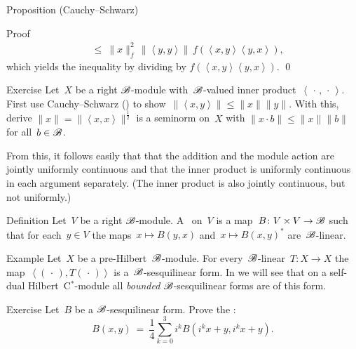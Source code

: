 \begin{parsec}
\begin{point}[module-CS]{Proposition (Cauchy--Schwarz)}
\begin{point}{Proof}
\begin{align*}
    & \ \leq\  \|x\|_f^2 \,
    \|\left<y,y\right>\| \,
    f(\left<x,y\right>\left<y,x\right>),
\end{align*}
    which yields the inequality by dividing by
$f(\left<x,y\right>\left<y,x\right>)$. \qed
\end{point}
\end{point}
\begin{point}{Exercise}
Let~$X$ be a right $\mathscr{B}$-module
    with~$\mathscr{B}$-valued inner product~$\left<\,\cdot\,,\,\cdot\,\right>$.
First use Cauchy--Schwarz ()
    to show~$\|\left<x,y\right>\| \leq \|x\|\|y\|$.
With this, derive $\|x\| =\|\left<x,x\right>\|^{\frac{1}{2}}$ is a seminorm on~$X$ with
    $\|x \cdot b \| \leq \|x\|\|b\|$
    for all~$b \in \mathscr{B}$.
\begin{point}%
From this, it follows easily that
that the addition and the module action
are jointly uniformly continuous
    and that the inner product is uniformly continuous in each argument
    separately.
(The inner product is also jointly continuous,
    but not uniformly.)
\end{point}
\end{point}
\begin{point}{Definition}%
Let~$V$ be a right $\mathscr{B}$-module.
A~ on~$V$
    is a map~$B\colon V\times V \to \mathscr{B}$
    such that for each~$y\in V$
    the maps~$x \mapsto B(y, x)$
        and~$x \mapsto B(x,y)^*$ are~$\mathscr{B}$-linear.
\end{point}
\begin{point}{Example}%
Let~$X$ be a pre-Hilbert~$\mathscr{B}$-module.
For every~$\mathscr{B}$-linear~$T\colon X \to X$
    the map~$\left<(\,\cdot\,), T (\,\cdot\,)\right>$
    is a~$\mathscr{B}$-sesquilinear form.
In 
    we will see that on a self-dual Hilbert~C$^*$-module
    all \emph{bounded}
    $\mathscr{B}$-sesquilinear forms
    are of this form.
\end{point}
\begin{point}{Exercise}%
Let~$B$ be a $\mathscr{B}$-sesquilinear form.
Prove the :
\begin{equation*}
    B(x,y) \ =\  \frac{1}{4} \sum_{k=0}^3 i^k B(i^k x + y, i^k x + y).
\end{equation*}
\end{point}
\end{parsec}


